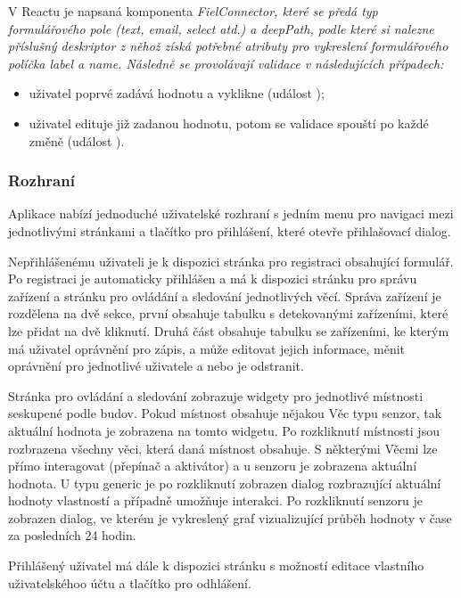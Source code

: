 V Reactu je napsaná komponenta \itshape{FielConnector}, které se předá typ formulářového pole (text, email, select atd.) a deepPath, podle které si nalezne příslušný deskriptor z něhož získá potřebné atributy pro vykreslení formulářového políčka label a name. Následně se provolávají validace v následujících případech:
\begin{itemize}
    \item uživatel poprvé zadává hodnotu a vyklikne (událost );
    \item uživatel edituje již zadanou hodnotu, potom se validace spouští po každé změně (událost ).
\end{itemize}

\subsubsection{Rozhraní}
Aplikace nabízí jednoduché uživatelské rozhraní s jedním menu pro navigaci mezi jednotlivými stránkami a tlačítko pro přihlášení, které otevře přihlašovací dialog.

Nepřihlášenému uživateli je k dispozici stránka pro registraci obsahující formulář. Po registraci je automaticky přihlášen a má k dispozici stránku pro správu zařízení a stránku pro ovládání a sledování jednotlivých věcí. Správa zařízení je rozdělena na dvě sekce, první obsahuje tabulku s detekovanými zařízeními, které lze přidat na dvě kliknutí. Druhá část obsahuje tabulku se zařízeními, ke kterým má uživatel oprávnění pro zápis, a může editovat jejich informace, měnit oprávnění pro jednotlivé uživatele a nebo je odstranit.

Stránka pro ovládání a sledování zobrazuje widgety pro jednotlivé místnosti seskupené podle budov. Pokud místnost obsahuje nějakou Věc typu senzor, tak aktuální hodnota je zobrazena na tomto widgetu. Po rozkliknutí místnosti jsou rozbrazena všechny věci, která daná místnost obsahuje. S některými Věcmi lze přímo interagovat (přepínač a aktivátor) a u senzoru je zobrazena aktuální hodnota. U typu generic je po rozkliknutí zobrazen dialog rozbrazující aktuální hodnoty vlastností a případně umožňuje interakci. Po rozkliknutí senzoru je zobrazen dialog, ve kterém je vykreslený graf vizualizující průběh hodnoty v čase za posledních 24 hodin.

Přihlášený uživatel má dále k dispozici stránku s možností editace vlastního uživatelskéhoo účtu a tlačítko pro odhlášení.

